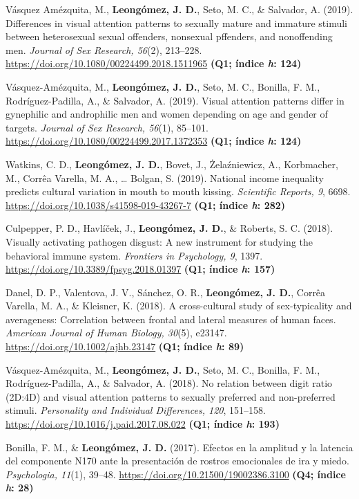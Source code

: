 \documentclass[11pt,a4paper,]{awesome-cv}
\begin{document}
Vásquez Amézquita, M., \textbf{Leongómez, J. D.}, Seto, M. C., \&
Salvador, A. (2019). Differences in visual attention patterns to
sexually mature and immature stimuli between heterosexual sexual
offenders, nonsexual pffenders, and nonoffending men. \emph{Journal of
Sex Research, 56}(2), 213--228.
\url{https://doi.org/10.1080/00224499.2018.1511965} \textbf{(Q1; índice
\emph{h}: 124)}

Vásquez-Amézquita, M., \textbf{Leongómez, J. D.}, Seto, M. C., Bonilla,
F. M., Rodríguez-Padilla, A., \& Salvador, A. (2019). Visual attention
patterns differ in gynephilic and androphilic men and women depending on
age and gender of targets. \emph{Journal of Sex Research, 56}(1),
85--101. \url{https://doi.org/10.1080/00224499.2017.1372353}
\textbf{(Q1; índice \emph{h}: 124)}

Watkins, C. D., \textbf{Leongómez, J. D.}, Bovet, J., Żelaźniewicz, A.,
Korbmacher, M., Corrêa Varella, M. A., \ldots{} Bolgan, S. (2019).
National income inequality predicts cultural variation in mouth to mouth
kissing. \emph{Scientific Reports, 9}, 6698.
\url{https://doi.org/10.1038/s41598-019-43267-7} \textbf{(Q1; índice
\emph{h}: 282)}

Culpepper, P. D., Havlíček, J., \textbf{Leongómez, J. D.}, \& Roberts,
S. C. (2018). Visually activating pathogen disgust: A new instrument for
studying the behavioral immune system. \emph{Frontiers in Psychology,
9}, 1397. \url{https://doi.org/10.3389/fpsyg.2018.01397} \textbf{(Q1;
índice \emph{h}: 157)}

Danel, D. P., Valentova, J. V., Sánchez, O. R.,
\textbf{Leongómez, J. D.}, Corrêa Varella, M. A., \& Kleisner, K.
(2018). A cross-cultural study of sex-typicality and averageness:
Correlation between frontal and lateral measures of human faces.
\emph{American Journal of Human Biology, 30}(5), e23147.
\url{https://doi.org/10.1002/ajhb.23147} \textbf{(Q1; índice \emph{h}:
89)}

Vásquez-Amézquita, M., \textbf{Leongómez, J. D.}, Seto, M. C., Bonilla,
F. M., Rodríguez-Padilla, A., \& Salvador, A. (2018). No relation
between digit ratio (2D:4D) and visual attention patterns to sexually
preferred and non-preferred stimuli. \emph{Personality and Individual
Differences, 120}, 151--158.
\url{https://doi.org/10.1016/j.paid.2017.08.022} \textbf{(Q1; índice
\emph{h}: 193)}

Bonilla, F. M., \& \textbf{Leongómez, J. D.} (2017). Efectos en la
amplitud y la latencia del componente N170 ante la presentación de
rostros emocionales de ira y miedo. \emph{Psychologia, 11}(1), 39--48.
\url{https://doi.org/10.21500/19002386.3100} \textbf{(Q4; índice
\emph{h}: 28)}
\end{document}
